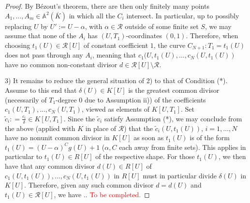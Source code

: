 \documentclass[11pt,a4paper,reqno]{amsart}
\theoremstyle{definition}
\begin{document}
\begin{proof}
By B\'ezout's theorem, there are then only finitely many points  $A_1,\dots, A_m\in \mathbb{A}^2(\overline{K})$ in which all the $C_i$ intersect.
In particular, up to possibly replacing $U$ by $U':=U-\alpha$, with $\alpha\in \mathcal{R}$ outside of some finite set $S$, we may assume that none of the $A_i$ has $(U,T_1)$-coordinates $(0,1)$. Therefore, when choosing $t_1(U)\in \mathcal{R}[U]$ of constant coefficient $1$, the curve $C_{N+1}: T_1 = t_1(U)$ does not pass through any $A_i$, meaning that $c_1(U,t_1(U),\dots, c_N(U,t_1(U))$ have no common non-constant divisor $d\in \mathcal{R}[U]\setminus \mathcal{R}$.


3) It remains to reduce the general situation of 2) to that of Condition (*).
Assume to this end that $\delta(U)\in K[U]$ is the greatest common divisor (necessarily of $T_1$-degree $0$ due to Assumption ii)) of the coefficients $c_1(U,T_1),\dots, c_N(U,T_1)$, viewed as elements of $K[U,T_1]$.
Set $\tilde{c}_i : =\frac{c_i}{\delta}\in K[U,T_1]$. Since the $\tilde{c}_i$ satisfy Assumption (*), we may conclude from the above (applied with $K$ in place of $\mathcal{R}$) that the $\tilde{c}_i(U,t_1(U))$, $i=1,\dots, N$ have no nonunit common divisor in $K[U]$ as soon as $t_1(U)$ is of the form $t_1(U)=(U-\alpha)^C g(U) + 1$ ($\alpha, C$ each away from finite sets). This applies in particular to $t_1(U)\in R[U]$ of the respective shape. For those $t_1(U)$, we then have that any common divisor $d(U)\in R[U]$ of $c_1(U, t_1(U)), \dots, c_N(U,t_1(U))$ in $R[U]$ must in particular divide $\delta(U)$ in $K[U]$.
Therefore, given any such common divisor $d=d(U)$ and $t_1(U)\in \mathcal{R}[U]$, we have ..
\textcolor{red}{To be completed.}
\end{proof}
\fi
\end{document}
